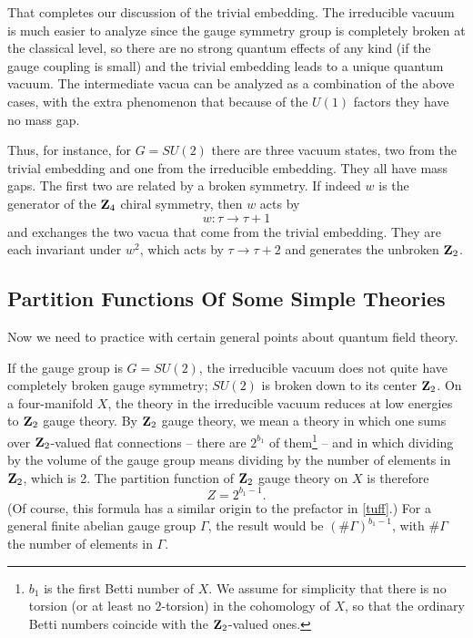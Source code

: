 \documentclass[12pt]{article}
\numberwithin{equation}{section}
\begin{document}
That completes our discussion of the trivial embedding.
The irreducible vacuum is much easier to analyze since the gauge symmetry
group is completely broken at the classical level, so there are no strong
quantum effects of any kind (if the gauge coupling is small) and the
trivial embedding leads to a unique quantum vacuum.
The intermediate vacua can be analyzed as a combination of the above
cases, with the extra phenomenon that because of the $U(1)$ factors
they have no mass gap.

Thus, for instance, for $G=SU(2)$ there are three vacuum states,
two from the trivial embedding and one from the irreducible embedding.
They all have mass gaps.  The first two are related by a broken
symmetry.
If indeed $w$ is the generator of the ${\bf Z}_4$ chiral symmetry,
then $w$ acts  by
\begin{equation}
  \label{wtau}
  w:\tau\to\tau+1
\end{equation}
and exchanges the two vacua that come from the trivial embedding.
They are each invariant under $w^2$, which acts by $\tau\to\tau+2$
and generates the unbroken ${\bf Z}_2$.

\subsection{Partition Functions Of Some Simple Theories}

Now we need to practice with certain general points about
quantum field theory.

If the gauge group is $G=SU(2)$,
the irreducible vacuum does not quite have completely broken
gauge symmetry; $SU(2)$ is broken down to its center
${\bf Z}_2$.  On a four-manifold $X$, the theory in the irreducible
vacuum reduces at low energies
to ${\bf Z}_2$ gauge theory.  By ${\bf Z}_2$ gauge theory, we mean
a theory in which one sums over ${\bf Z}_2$-valued flat connections
-- there are $2^{b_1}$ of them\footnote{$b_1$ is the first Betti
  number of $X$.  We assume for simplicity that there is no torsion (or
  at least no $2$-torsion) in the cohomology of $X$, so that the
ordinary Betti numbers coincide with the ${\bf Z}_2$-valued ones.} --
and in which dividing by the volume of the gauge group means dividing
by the number of elements in ${\bf Z}_2$, which is 2.  The partition
function of ${\bf Z}_2$ gauge theory on $X$ is therefore
\begin{equation}
  \label{impono}
  Z=2^{b_1-1}.
\end{equation}
(Of course, this formula has a similar origin to the prefactor in \eqref{tuff}.)
For a general finite abelian gauge group $\Gamma$, the result would be
$(\# \Gamma)^{b_1-1}$, with $\#\Gamma$ the number of elements in $\Gamma$.
\end{document}
